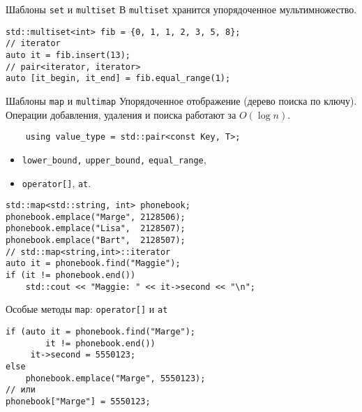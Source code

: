 \documentclass{beamer}
\begin{document}
\begin{frame}[fragile]{Шаблоны {\tt set} и {\tt multiset}}
В \texttt{multiset} хранится упорядоченное мультимножество.
\vspace{-1mm}
\begin{lstlisting}
std::multiset<int> fib = {0, 1, 1, 2, 3, 5, 8};
// iterator
auto it = fib.insert(13);
// pair<iterator, iterator>
auto [it_begin, it_end] = fib.equal_range(1);
\end{lstlisting}
\end{frame}

\begin{frame}[fragile]{Шаблоны {\tt map} и {\tt multimap}}
Упорядоченное отображение (дерево поиска по ключу).\\ 
Операции добавления, удаления и поиска работают за $O(\log n)$.
\begin{lstlisting}
    using value_type = std::pair<const Key, T>;
\end{lstlisting}\vspace{-1mm}

\begin{itemize}
    \item {\tt lower\_bound,} {\tt upper\_bound,} {\tt equal\_range},
    \item {\tt operator[]}, {\tt at}.
\end{itemize}\vspace{-1mm}
\begin{lstlisting}
std::map<std::string, int> phonebook;
phonebook.emplace("Marge", 2128506);
phonebook.emplace("Lisa",  2128507);
phonebook.emplace("Bart",  2128507);
// std::map<string,int>::iterator
auto it = phonebook.find("Maggie");
if (it != phonebook.end())
    std::cout << "Maggie: " << it->second << "\n";
\end{lstlisting}
\end{frame}

\begin{frame}[fragile]{Особые методы {\tt map}: {\tt operator[]} и {\tt at}}
\begin{lstlisting}
if (auto it = phonebook.find("Marge"); 
        it != phonebook.end())
     it->second = 5550123;
else 
    phonebook.emplace("Marge", 5550123);
// или
phonebook["Marge"] = 5550123;
\end{lstlisting}
\end{frame}
\end{document}
